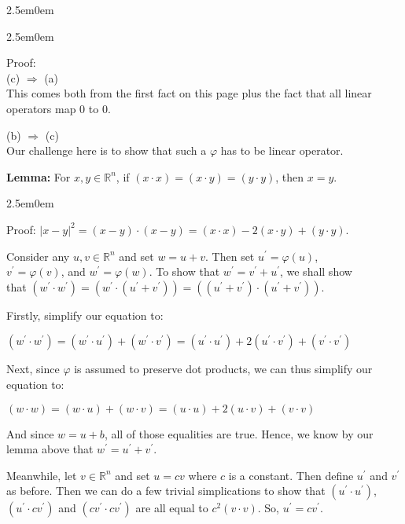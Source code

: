 \documentclass{book}
\newcommand{\hThree}{%
   \color{PineGreen!85!Orange}
   \fontsize{12}{14}\selectfont%
}
\newenvironment{myIndent}{%
   \begin{adjustwidth}{2.5em}{0em}%
}{%
   \end{adjustwidth}%
}
\newcommand{\blab}[1]{\textbf{#1}}
\newcommand{\retTwo}{\hfill\bigbreak}
\begin{document}
\begin{myIndent}
\begin{itemize}
		\begin{myIndent}\hThree
			Proof:\\
			(c) $\Longrightarrow$ (a)\\
			This comes both from the first fact on this page plus the fact that all linear\\ operators map $0$ to $0$.\retTwo

			(b) $\Longrightarrow$ (c)\\
			Our challenge here is to show that such a $\varphi$ has to be linear operator.\retTwo

			\blab{Lemma:} For $x, y \in \mathbb{R}^n$, if $(x \cdot x) = (x \cdot y) = (y \cdot y)$, then $x = y$.
			
			\begin{myIndent}\hThree
				Proof: $|x - y|^2 = (x - y) \cdot (x - y) = (x \cdot x) - 2(x \cdot y) + (y \cdot y)$.\retTwo
			\end{myIndent}

			Consider any $u, v \in \mathbb{R}^n$ and set $w = u + v$. Then set $u^\prime = \varphi(u)$,\\ $v^\prime = \varphi(v)$, and $w^\prime = \varphi(w)$. To show that $w^\prime = v^\prime + u^\prime$, we shall show\\ that $(w^\prime \cdot w^\prime) = (w^\prime \cdot (u^\prime + v^\prime)) = ((u^\prime + v^\prime) \cdot (u^\prime + v^\prime))$.\retTwo

			Firstly, simplify our equation to:

			{\centering $(w^\prime \cdot w^\prime) = (w^\prime \cdot u^\prime) + (w^\prime \cdot v^\prime) = (u^\prime \cdot u^\prime) + 2(u^\prime \cdot v^\prime) + (v^\prime \cdot v^\prime)$ \retTwo\par}

			Next, since $\varphi$ is assumed to preserve dot products, we can thus simplify our\\ equation to:

			{\centering $(w \cdot w) = (w \cdot u) + (w \cdot v) = (u \cdot u) + 2(u\cdot v) + (v \cdot v)$ \retTwo\par}

			And since $w = u + b$, all of those equalities are true. Hence, we know by our lemma above that $w^\prime = u^\prime + v^\prime$.\newpage

			Meanwhile, let $v \in \mathbb{R}^n$ and set $u = cv$ where $c$ is a constant. Then define $u^\prime$ and $v^\prime$ as before. Then we can do a few trivial simplications to show that $(u^\prime \cdot u^\prime)$, $(u^\prime \cdot cv^\prime)$ and $(cv^\prime \cdot cv^\prime)$ are all equal to $c^2(v \cdot v)$. So, $u^\prime = cv^\prime$.\retTwo


\end{myIndent}
\end{itemize}
\end{myIndent}
\end{document}
